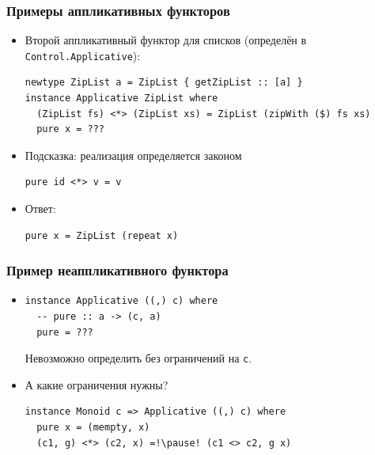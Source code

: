 \documentclass[11pt]{beamer}
\begin{document}
\begin{frame}[fragile]
  \frametitle{Примеры аппликативных функторов}
  \begin{itemize}
    \item Второй аппликативный функтор для списков (определён в \lstinline|Control.Applicative|):
          \begin{lstlisting}[basicstyle=\ttfamily\small]
newtype ZipList a = ZipList { getZipList :: [a] }
instance Applicative ZipList where 
  (ZipList fs) <*> (ZipList xs) = ZipList (zipWith ($) fs xs)
  pure x = ???
\end{lstlisting}
          \pause
    \item Подсказка: реализация определяется законом
          \begin{lstlisting}[basicstyle=\ttfamily\small]
pure id <*> v = v
\end{lstlisting}
          \pause
    \item Ответ:
          \begin{lstlisting}[basicstyle=\ttfamily\small]
pure x = ZipList (repeat x)
\end{lstlisting}
  \end{itemize}
\end{frame}

\begin{frame}[fragile]
  \frametitle{Пример неаппликативного функтора}
  \begin{itemize}
    \item
          \begin{lstlisting}[basicstyle=\ttfamily\small]
instance Applicative ((,) c) where 
  -- pure :: a -> (c, a)
  pure = ???
\end{lstlisting}
          \pause Невозможно определить без ограничений на \lstinline|c|.
          \pause
    \item А какие ограничения нужны? \pause
          \begin{lstlisting}[basicstyle=\ttfamily\small]
instance Monoid c => Applicative ((,) c) where
  pure x = (mempty, x)
  (c1, g) <*> (c2, x) =!\pause! (c1 <> c2, g x)
\end{lstlisting}
  \end{itemize}
\end{frame}
\end{document}
